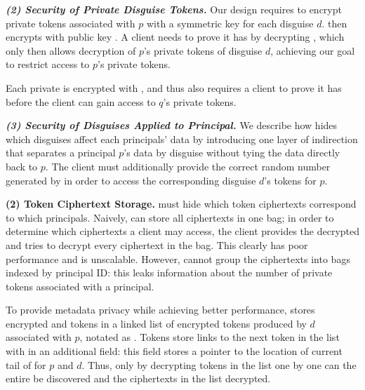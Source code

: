 \vspace{6pt}\noindent\textbf{\emph{(2) Security of Private Disguise Tokens.}}
Our design requires \sys to encrypt private \tdata{} tokens associated with $p$ with a symmetric key
 for each disguise $d$. \sys then encrypts  with public key .  
A client needs to prove it has  by decrypting , which only then allows decryption
of $p$'s private tokens of disguise $d$, achieving our goal to restrict access to $p$'s private
tokens.

Each private  is encrypted with , and thus also requires a client to prove it has
 before the client can gain access to $q$'s private tokens.

\vspace{6pt}\noindent\textbf{\emph{(3) Security of Disguises Applied to Principal.}}
We describe how \sys hides which disguises affect each principals' data by introducing one layer of
indirection that separates a principal $p$'s data by disguise without tying the data directly back to
$p$. The client must additionally provide the correct random number generated by \sys in order to
access the corresponding disguise $d$'s tokens for $p$.

\iffalse
\vspace{6pt}\noindent\textbf{(2) \tdata{} Token Ciphertext Storage.}
\sys must hide which token ciphertexts correspond to which principals.  Naively, \sys can store
all ciphertexts in one bag; in order to determine which ciphertexts a client may access, the client
provides the decrypted  and \sys tries to decrypt every ciphertext in the bag. This clearly
has poor performance and is unscalable.
However, \sys cannot group the ciphertexts into bags indexed by principal ID: this leaks information
about the number of private tokens associated with a principal.

To provide metadata privacy while achieving better performance, \sys stores encrypted  and
 tokens in a linked list of encrypted tokens produced by $d$ associated with $p$, notated
as . 
Tokens store links to the next token in the list with in an additional  field: this
field stores a pointer to the location of current tail of  for $p$ and $d$.
Thus, only by decrypting tokens in the list one by one can the entire  be discovered and
the ciphertexts in the list decrypted.

